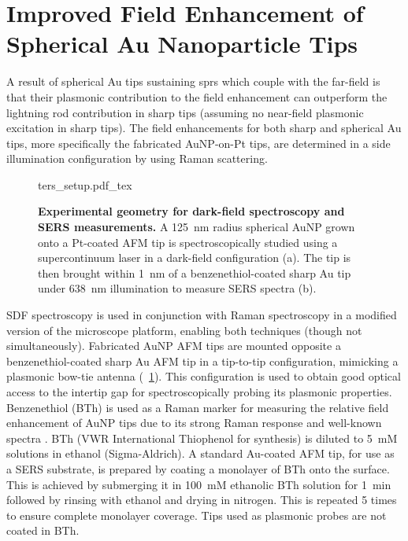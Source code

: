 \documentclass{article}
\begin{document}
\section{Improved Field Enhancement of Spherical Au Nanoparticle Tips}
\label{sec:tip_applications}

A result of spherical Au tips sustaining \glspl{spr} which couple with the far-field is that their plasmonic contribution to the field enhancement can outperform the lightning rod contribution in sharp tips (assuming no near-field plasmonic excitation in sharp tips). The field enhancements for both sharp and spherical Au tips, more specifically the fabricated AuNP-on-Pt tips, are determined in a side illumination configuration by using Raman scattering.

\begin{figure}[bt]
\centering
\def\svgwidth{0.6\textwidth}\fontsize{10pt}{1em}\selectfont
{ters_setup.pdf_tex}
\caption[Experimental geometry for dark-field spectroscopy and SERS measurements]{\textbf{Experimental geometry for dark-field spectroscopy and SERS measurements.} A \SI{125}{nm} radius spherical AuNP grown onto a Pt-coated AFM tip is spectroscopically studied using a supercontinuum laser in a dark-field configuration (a). The tip is then brought within \SI{1}{nm} of a benzenethiol-coated sharp Au tip under \SI{638}{nm} illumination to measure SERS spectra (b).}
\label{fig:ters_setup}
\end{figure}

SDF spectroscopy is used in conjunction with Raman spectroscopy in a modified version of the microscope platform, enabling both techniques (though not simultaneously). Fabricated AuNP AFM tips are mounted opposite a benzenethiol-coated sharp Au AFM tip in a tip-to-tip configuration, mimicking a plasmonic bow-tie antenna (\figurename~\ref{fig:ters_setup}). This configuration is used to obtain good optical access to the intertip gap for spectroscopically probing its plasmonic properties. Benzenethiol (BTh) is used as a Raman marker for measuring the relative field enhancement of AuNP tips due to its strong Raman response and well-known spectra \cite{mahajan2009, dudin2010}.
BTh (VWR International Thiophenol for synthesis) is diluted to \SI{5}{mM} solutions in ethanol (Sigma-Aldrich). A standard Au-coated AFM tip, for use as a SERS substrate, is prepared by coating a monolayer of BTh onto the surface. This is achieved by submerging it in \SI{100}{mM} ethanolic BTh solution for \SI{1}{\minute} followed by rinsing with ethanol and drying in nitrogen. This is repeated 5 times to ensure complete monolayer coverage. Tips used as plasmonic probes are not coated in BTh.
\end{document}
